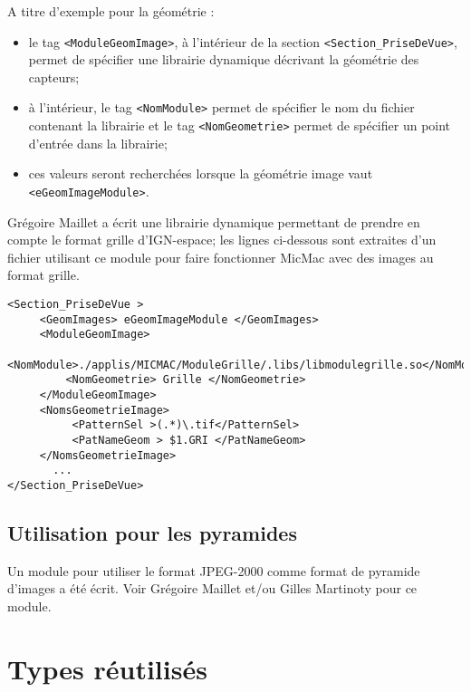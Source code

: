 A titre d'exemple pour la g\'eom\'etrie :

\begin{itemize}
   \item le tag {\tt <ModuleGeomImage>}, \`a l'int\'erieur de la 
         section {\tt <Section\_PriseDeVue>}, permet de sp\'ecifier
         une librairie dynamique d\'ecrivant la g\'eom\'etrie des
         capteurs;

   \item \`a l'int\'erieur, le tag {\tt <NomModule>} permet de sp\'ecifier
         le nom du fichier contenant la librairie  et le tag  {\tt <NomGeometrie>}
         permet de sp\'ecifier un point d'entr\'ee dans la librairie;

   \item ces valeurs seront recherch\'ees lorsque  la g\'eom\'etrie image
         vaut  {\tt <eGeomImageModule>}.
\end{itemize}

Gr\'egoire Maillet a \'ecrit une librairie dynamique permettant de
prendre en compte le format grille d'IGN-espace; les lignes
ci-dessous sont extraites d'un fichier utilisant ce module
pour faire fonctionner MicMac avec des images au format grille.

\begin{verbatim}
<Section_PriseDeVue >
     <GeomImages> eGeomImageModule </GeomImages>
     <ModuleGeomImage>
         <NomModule>./applis/MICMAC/ModuleGrille/.libs/libmodulegrille.so</NomModule>
         <NomGeometrie> Grille </NomGeometrie>
     </ModuleGeomImage>
     <NomsGeometrieImage>
          <PatternSel >(.*)\.tif</PatternSel>
          <PatNameGeom > $1.GRI </PatNameGeom>
     </NomsGeometrieImage>
       ...
</Section_PriseDeVue>
\end{verbatim}

\subsection{Utilisation pour les pyramides}

Un module pour utiliser le format JPEG-2000 comme format 
de pyramide d'images a \'et\'e \'ecrit. Voir Gr\'egoire Maillet
et/ou Gilles Martinoty pour ce module.


\section{Types r\'eutilis\'es}

